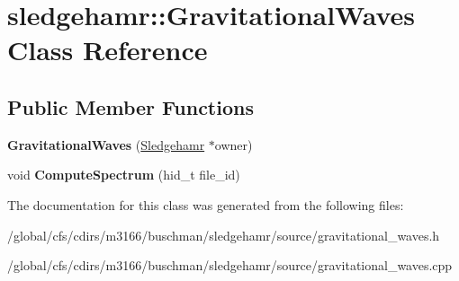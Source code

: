 \hypertarget{classsledgehamr_1_1GravitationalWaves}{}\section{sledgehamr\+:\+:Gravitational\+Waves Class Reference}
\label{classsledgehamr_1_1GravitationalWaves}
\subsection*{Public Member Functions}
\begin{DoxyCompactItemize}
\item 
\mbox{\label{classsledgehamr_1_1GravitationalWaves_a2d9489551b81e733bb1685023a3945b0}} 
{\bfseries Gravitational\+Waves} (\mbox{\hyperlink{classsledgehamr_1_1Sledgehamr}{Sledgehamr}} $\ast$owner)
\item 
\mbox{\label{classsledgehamr_1_1GravitationalWaves_aa00cb3f7c6993a6bb7eb6d5475a6cfa0}} 
void {\bfseries Compute\+Spectrum} (hid\+\_\+t file\+\_\+id)
\end{DoxyCompactItemize}


The documentation for this class was generated from the following files\+:\begin{DoxyCompactItemize}
\item 
/global/cfs/cdirs/m3166/buschman/sledgehamr/source/gravitational\+\_\+waves.\+h\item 
/global/cfs/cdirs/m3166/buschman/sledgehamr/source/gravitational\+\_\+waves.\+cpp\end{DoxyCompactItemize}
